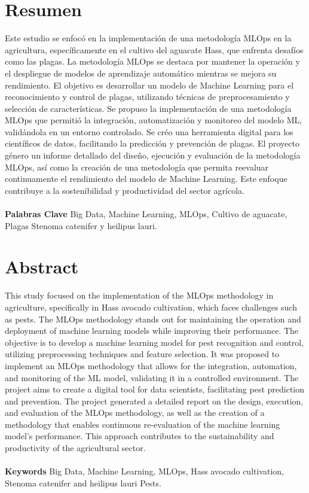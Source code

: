 \thispagestyle{empty}
\section*{Resumen}
Este estudio se enfocó en la implementación de una metodología MLOps en la agricultura, específicamente en el cultivo del aguacate Hass, que enfrenta desafíos como las plagas. La metodología MLOps se destaca por mantener la operación y el despliegue de modelos de aprendizaje automático mientras se mejora su rendimiento. El objetivo es desarrollar un modelo de Machine Learning para el reconocimiento y control de plagas, utilizando técnicas de preprocesamiento y selección de características. Se propuso la implementación de una metodología MLOps que permitió la integración, automatización y monitoreo del modelo ML, validándola en un entorno controlado. Se créo una herramienta digital para los científicos de datos, facilitando la predicción y prevención de plagas. El proyecto género un informe detallado del diseño, ejecución y evaluación de la metodología MLOps, así como la creación de una metodología que permita reevaluar continuamente el rendimiento del modelo de Machine Learning. Este enfoque contribuye a la sostenibilidad y productividad del sector agrícola.


\paragraph*{}{\textbf{Palabras Clave}} Big Data, Machine Learning, MLOps, Cultivo de
aguacate, Plagas Stenoma catenifer y heilipus lauri.

\section*{Abstract}
This study focused on the implementation of the MLOps methodology in agriculture, specifically in Hass avocado cultivation, which faces challenges such as pests. The MLOps methodology stands out for maintaining the operation and deployment of machine learning models while improving their performance. The objective is to develop a machine learning model for pest recognition and control, utilizing preprocessing techniques and feature selection. It was proposed to implement an MLOps methodology that allows for the integration, automation, and monitoring of the ML model, validating it in a controlled environment. The project aims to create a digital tool for data scientists, facilitating pest prediction and prevention. The project generated a detailed report on the design, execution, and evaluation of the MLOps methodology, as well as the creation of a methodology that enables continuous re-evaluation of the machine learning model's performance. This approach contributes to the sustainability and productivity of the agricultural sector.
\paragraph*{}{\textbf{Keywords}} Big Data, Machine Learning, MLOps, Hass avocado cultivation, Stenoma catenifer and heilipus lauri Pests.
